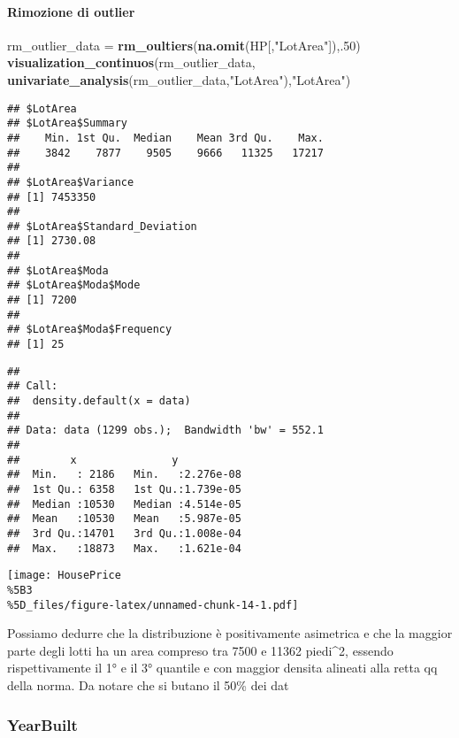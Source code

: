 \documentclass[
]{article}
\newenvironment{Shaded}{\begin{snugshade}}{\end{snugshade}}
\newcommand{\DecValTok}[1]{\textcolor[rgb]{0.00,0.00,0.81}{#1}}
\newcommand{\FunctionTok}[1]{\textcolor[rgb]{0.13,0.29,0.53}{\textbf{#1}}}
\newcommand{\NormalTok}[1]{#1}
\newcommand{\OtherTok}[1]{\textcolor[rgb]{0.56,0.35,0.01}{#1}}
\newcommand{\StringTok}[1]{\textcolor[rgb]{0.31,0.60,0.02}{#1}}
\begin{document}
\paragraph{Rimozione di outlier}\label{rimozione-di-outlier-1}

\begin{Shaded}
\begin{Highlighting}[]
\NormalTok{rm\_outlier\_data }\OtherTok{=} \FunctionTok{rm\_oultiers}\NormalTok{(}\FunctionTok{na.omit}\NormalTok{(HP[,}\StringTok{"LotArea"}\NormalTok{]),.}\DecValTok{50}\NormalTok{)}
\FunctionTok{visualization\_continuos}\NormalTok{(rm\_outlier\_data, }\FunctionTok{univariate\_analysis}\NormalTok{(rm\_outlier\_data,}\StringTok{"LotArea"}\NormalTok{),}\StringTok{"LotArea"}\NormalTok{)}
\end{Highlighting}
\end{Shaded}

\begin{verbatim}
## $LotArea
## $LotArea$Summary
##    Min. 1st Qu.  Median    Mean 3rd Qu.    Max. 
##    3842    7877    9505    9666   11325   17217 
## 
## $LotArea$Variance
## [1] 7453350
## 
## $LotArea$Standard_Deviation
## [1] 2730.08
## 
## $LotArea$Moda
## $LotArea$Moda$Mode
## [1] 7200
## 
## $LotArea$Moda$Frequency
## [1] 25
\end{verbatim}

\begin{verbatim}
## 
## Call:
##  density.default(x = data)
## 
## Data: data (1299 obs.);  Bandwidth 'bw' = 552.1
## 
##        x               y            
##  Min.   : 2186   Min.   :2.276e-08  
##  1st Qu.: 6358   1st Qu.:1.739e-05  
##  Median :10530   Median :4.514e-05  
##  Mean   :10530   Mean   :5.987e-05  
##  3rd Qu.:14701   3rd Qu.:1.008e-04  
##  Max.   :18873   Max.   :1.621e-04
\end{verbatim}

\texttt{[image: HousePrice\\\%5B3\\\%5D\_files/figure-latex/unnamed-chunk-14-1.pdf]}

Possiamo dedurre che la distribuzione è positivamente asimetrica e che
la maggior parte degli lotti ha un area compreso tra 7500 e 11362
piedi\^{}2, essendo rispettivamente il 1° e il 3° quantile e con maggior
densita alineati alla retta qq della norma. Da notare che si butano il
50\% dei dat

\subsubsection{YearBuilt}\label{yearbuilt}
\end{document}

